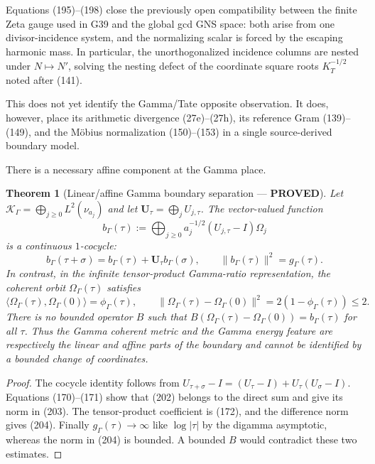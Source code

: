 \documentclass[11pt]{article}
\newtheorem{theorem}{Theorem}
\newcommand{\PROVED}{\textcolor{green!45!black}{\textbf{PROVED}}}
\begin{document}
Equations (195)--(198) close the previously open compatibility between the
finite Zeta gauge used in G39 and the global gcd GNS space: both arise from
one divisor-incidence system, and the normalizing scalar is forced by the
escaping harmonic mass.  In particular, the unorthogonalized incidence
columns are nested under $N\mapsto N'$, solving the nesting defect of the
coordinate square roots $K_T^{-1/2}$ noted after (141).

This does not yet identify the Gamma/Tate opposite observation.  It does,
however, place its arithmetic divergence (27e)--(27h), its reference Gram
(139)--(149), and the M\"obius normalization (150)--(153) in a single
source-derived boundary model.

There is a necessary affine component at the Gamma place.

\begin{theorem}[Linear/affine Gamma boundary separation --- \PROVED]
Let $\mathscr K_\Gamma=\bigoplus_{j\ge0}L^2(\nu_{a_j})$ and let
$\mathbf U_\tau=\bigoplus_jU_{j,\tau}$.  The vector-valued function
\begin{equation}
 b_\Gamma(\tau):=\bigoplus_{j\ge0}
 a_j^{-1/2}(U_{j,\tau}-I)\Omega_j                  \tag{202}
\end{equation}
is a continuous $1$-cocycle:
\begin{equation}
 b_\Gamma(\tau+\sigma)
 =b_\Gamma(\tau)+\mathbf U_\tau b_\Gamma(\sigma),
 \qquad
 \|b_\Gamma(\tau)\|^2=g_\Gamma(\tau).              \tag{203}
\end{equation}
In contrast, in the infinite tensor-product Gamma-ratio representation,
the coherent orbit $\Omega_\Gamma(\tau)$ satisfies
\begin{equation}
 \langle\Omega_\Gamma(\tau),\Omega_\Gamma(0)\rangle
 =\phi_\Gamma(\tau),
 \qquad
 \|\Omega_\Gamma(\tau)-\Omega_\Gamma(0)\|^2
 =2(1-\phi_\Gamma(\tau))\le2.                         \tag{204}
\end{equation}
There is no bounded operator $B$ such that
$B(\Omega_\Gamma(\tau)-\Omega_\Gamma(0))=b_\Gamma(\tau)$ for all $\tau$.
Thus the Gamma coherent metric and the Gamma energy feature are respectively
the linear and affine parts of the boundary and cannot be identified by a
bounded change of coordinates.
\end{theorem}

\begin{proof}
The cocycle identity follows from
$U_{\tau+\sigma}-I=(U_\tau-I)+U_\tau(U_\sigma-I)$.
Equations (170)--(171) show that (202) belongs to the direct sum and give its
norm in (203).  The tensor-product coefficient is (172), and the difference
norm gives (204).  Finally $g_\Gamma(\tau)\to\infty$ like $\log|\tau|$ by
the digamma asymptotic, whereas the norm in (204) is bounded.  A bounded
$B$ would contradict these two estimates.
\end{proof}
\end{document}
